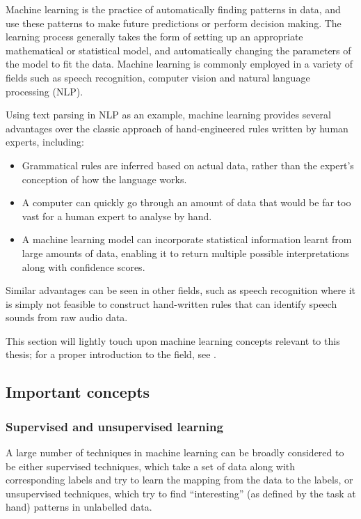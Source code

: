 Machine learning is the practice of automatically finding patterns in data, and use these patterns to make future predictions or perform decision making.
The learning process generally takes the form of setting up an appropriate mathematical or statistical model, and automatically changing the parameters of the model to fit the data.
Machine learning is commonly employed in a variety of fields such as speech recognition, computer vision and natural language processing (NLP).

Using text parsing in NLP as an example, machine learning provides several advantages over the classic approach of hand-engineered rules written by human experts, including:
\begin{itemize}
 \item Grammatical rules are inferred based on actual data, rather than the expert's conception of how the language works.
 \item A computer can quickly go through an amount of data that would be far too vast for a human expert to analyse by hand.
 \item A machine learning model can incorporate statistical information learnt from large amounts of data, enabling it to return multiple possible interpretations along with confidence scores.
\end{itemize}
Similar advantages can be seen in other fields, such as speech recognition where it is simply not feasible to construct hand-written rules that can identify speech sounds from raw audio data.

This section will lightly touch upon machine learning concepts relevant to this thesis; for a proper introduction to the field, see \textcite{murphy2012machine}.

\subsection{Important concepts}
\subsubsection{Supervised and unsupervised learning}

A large number of techniques in machine learning can be broadly considered to be either supervised techniques, which take a set of data along with corresponding labels and try to learn the mapping from the data to the labels, or unsupervised techniques, which try to find ``interesting'' (as defined by the task at hand) patterns in unlabelled data.

